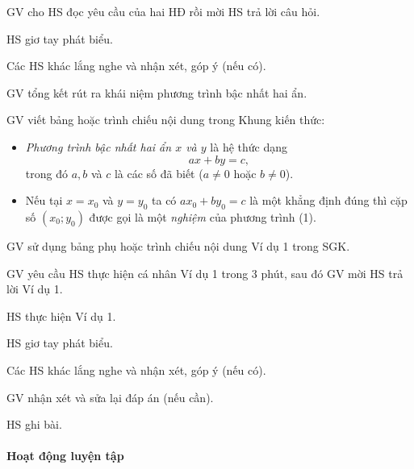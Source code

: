 \tochucthuchien

\begin{tcth}[ttkp]
    \buocmot
    \item GV cho HS đọc yêu cầu của hai HĐ rồi mời HS trả lời câu hỏi.
    \buochai
    \item HS giơ tay phát biểu.
    \buocba
    \item Các HS khác lắng nghe và nhận xét, góp ý (nếu có).
    \item GV tổng kết rút ra khái niệm phương trình bậc nhất hai ẩn.
    \buocbon
    \item GV viết bảng hoặc trình chiếu nội dung trong Khung kiến thức:
    \begin{kttt}
        \begin{itemize}
            \item \textit{Phương trình bậc nhất hai ẩn $x$ và $y$} là hệ thức dạng
            \begin{equation}
                ax + by = c, \tag{1}
            \end{equation}
            trong đó $a, b$ và $c$ là các số đã biết ($a \neq 0$ hoặc $b \neq 0$).
            
            \item Nếu tại $x = x_0$ và $y = y_0$ ta có $ax_0 + by_0 = c$ là một khẳng định đúng thì cặp số $(x_0; y_0)$ được gọi là một \textit{nghiệm} của phương trình (1).
        \end{itemize}
    \end{kttt}
\end{tcth}

\begin{tcth}[vidu=1]
    \buocmot
    \item GV sử dụng bảng phụ hoặc trình chiếu nội dung Ví dụ 1 trong SGK. 
    \item GV yêu cầu HS thực hiện cá nhân Ví dụ 1 trong 3 phút, sau đó GV mời HS trả lời Ví dụ 1.
    \buochai
    \item HS thực hiện Ví dụ 1.
    \item HS giơ tay phát biểu.
    \buocba
    \item Các HS khác lắng nghe và nhận xét, góp ý (nếu có).
    \buocbon
    \item GV nhận xét và sửa lại đáp án (nếu cần).
    \item HS ghi bài.
\end{tcth}

\paragraph{Hoạt động luyện tập}

